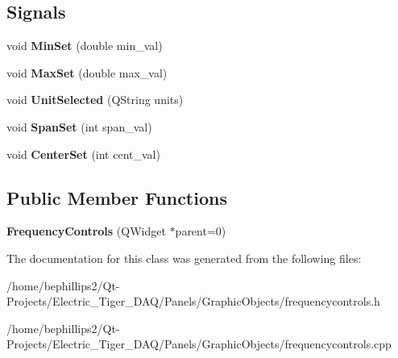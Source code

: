 \subsection*{Signals}
\begin{DoxyCompactItemize}
\item 
void {\bfseries Min\+Set} (double min\+\_\+val)\hypertarget{class_frequency_controls_a3544c74823a7aaabc9a0779ae839eb7f}{}\label{class_frequency_controls_a3544c74823a7aaabc9a0779ae839eb7f}

\item 
void {\bfseries Max\+Set} (double max\+\_\+val)\hypertarget{class_frequency_controls_ad8606de91f4ec71aa8011f658da35a4e}{}\label{class_frequency_controls_ad8606de91f4ec71aa8011f658da35a4e}

\item 
void {\bfseries Unit\+Selected} (Q\+String units)\hypertarget{class_frequency_controls_a5b873965eb03064dbcf713d0c66126d0}{}\label{class_frequency_controls_a5b873965eb03064dbcf713d0c66126d0}

\item 
void {\bfseries Span\+Set} (int span\+\_\+val)\hypertarget{class_frequency_controls_aef534d12777d179c45b59a47c8c1b431}{}\label{class_frequency_controls_aef534d12777d179c45b59a47c8c1b431}

\item 
void {\bfseries Center\+Set} (int cent\+\_\+val)\hypertarget{class_frequency_controls_afd8a0e6ada7b9063e15d55c9c6b562cb}{}\label{class_frequency_controls_afd8a0e6ada7b9063e15d55c9c6b562cb}

\end{DoxyCompactItemize}
\subsection*{Public Member Functions}
\begin{DoxyCompactItemize}
\item 
{\bfseries Frequency\+Controls} (Q\+Widget $\ast$parent=0)\hypertarget{class_frequency_controls_a41928b0575667ca2677e824a0907285b}{}\label{class_frequency_controls_a41928b0575667ca2677e824a0907285b}

\end{DoxyCompactItemize}


The documentation for this class was generated from the following files\+:\begin{DoxyCompactItemize}
\item 
/home/bephillips2/\+Qt-\/\+Projects/\+Electric\+\_\+\+Tiger\+\_\+\+D\+A\+Q/\+Panels/\+Graphic\+Objects/frequencycontrols.\+h\item 
/home/bephillips2/\+Qt-\/\+Projects/\+Electric\+\_\+\+Tiger\+\_\+\+D\+A\+Q/\+Panels/\+Graphic\+Objects/frequencycontrols.\+cpp\end{DoxyCompactItemize}
